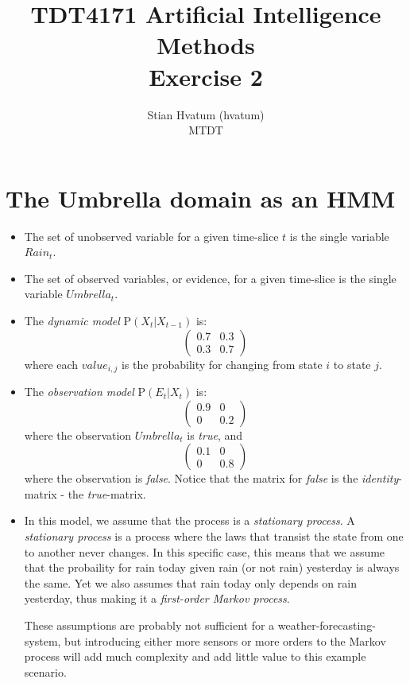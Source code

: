 \documentclass[english]{article}
\title{TDT4171 Artificial Intelligence Methods\\
\Huge Exercise 2}
\author{Stian Hvatum (hvatum)\\MTDT}
\begin{document}
\maketitle
{}
\newpage
\section{The Umbrella domain as an HMM}
\begin{itemize}
  \item The set of unobserved variable for a given time-slice \(t\) is the single variable \(Rain_t\).
  \item The set of observed variables, or evidence, for a given time-slice is the single variable \(Umbrella_t\).
  \item The \emph{dynamic model} P\((X_t|X_{t-1})\) is:
\[ \left(
   \begin{array}{cc}
    0.7 & 0.3 \\
	0.3 & 0.7
	\end{array}
\right)\] 
where each \(value_{i,j}\) is the probability for changing from state \(i\) to
state \(j\).
  \item The \emph{observation model} P\((E_t|X_t)\) is:
\[ \left(
   \begin{array}{cc}
    0.9 & 0 \\
	0 & 0.2
	\end{array}
\right)\]
where the observation \(Umbrella_t\) is \emph{true}, and 
\[ \left(
   \begin{array}{cc}
    0.1 & 0 \\
	0 & 0.8
	\end{array}
\right)\] 
where the observation is \emph{false}. Notice that the matrix for \emph{false}
is the \emph{identity}-matrix - the \emph{true}-matrix.

\item In this model, we assume that the process is a \emph{stationary process}.
A \emph{stationary process} is a process where the laws that transist the state
from one to another never changes. In this specific case, this means that we
assume that the probaility for rain today given rain (or not rain) yesterday is
always the same. Yet we also assumes that rain today only depends on rain
yesterday, thus making it a \emph{first-order Markov process}.

These assumptions are probably not sufficient for a weather-forecasting-system,
but introducing either more sensors or more orders to the Markov process will
add much complexity and add little value to this example scenario.
\end{itemize}
\end{document}

